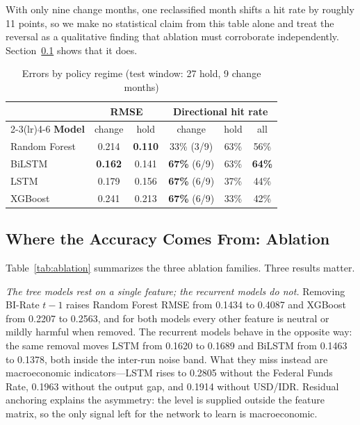 \documentclass[conference]{IEEEtran}
\begin{document}
With only nine change months, one reclassified month shifts a hit rate by roughly 11 points, so we make no statistical claim from this table alone and treat the reversal as a qualitative finding that ablation must corroborate independently. Section~\ref{sec:ablation} shows that it does.


\begin{table}[htbp]
\caption{Errors by policy regime (test window: 27 hold, 9 change months)}
\begin{center}
\setlength{\tabcolsep}{4pt}
\begin{tabular}{lccccc}
\toprule
& \multicolumn{2}{c}{\textbf{RMSE}} & \multicolumn{3}{c}{\textbf{Directional hit rate}} \\
\cmidrule(lr){2-3}\cmidrule(lr){4-6}
\textbf{Model} & change & hold & change & hold & all \\
\midrule
Random Forest & 0.214 & \textbf{0.110} & 33\% (3/9) & 63\% & 56\% \\
BiLSTM & \textbf{0.162} & 0.141 & \textbf{67\%} (6/9) & 63\% & \textbf{64\%} \\
LSTM & 0.179 & 0.156 & \textbf{67\%} (6/9) & 37\% & 44\% \\
XGBoost & 0.241 & 0.213 & \textbf{67\%} (6/9) & 33\% & 42\% \\
\bottomrule
\end{tabular}
\label{tab:regime}
\end{center}
\end{table}

\subsection{Where the Accuracy Comes From: Ablation}
\label{sec:ablation}
Table~\ref{tab:ablation} summarizes the three ablation families. Three results matter.

\emph{The tree models rest on a single feature; the recurrent models do not.} Removing BI-Rate $t-1$ raises Random Forest RMSE from 0.1434 to 0.4087 and XGBoost from 0.2207 to 0.2563, and for both models every other feature is neutral or mildly harmful when removed. The recurrent models behave in the opposite way: the same removal moves LSTM from 0.1620 to 0.1689 and BiLSTM from 0.1463 to 0.1378, both inside the inter-run noise band. What they miss instead are macroeconomic indicators---LSTM rises to 0.2805 without the Federal Funds Rate, 0.1963 without the output gap, and 0.1914 without USD/IDR. Residual anchoring explains the asymmetry: the level is supplied outside the feature matrix, so the only signal left for the network to learn is macroeconomic.
\end{document}
